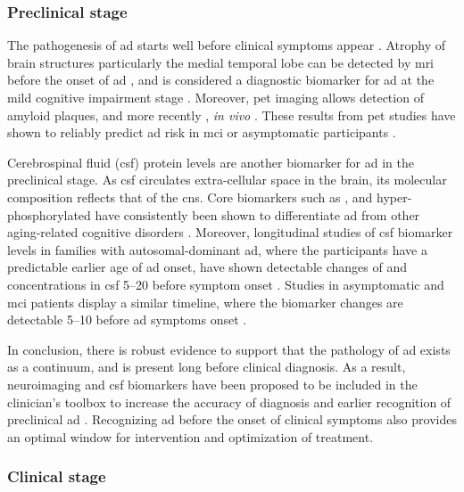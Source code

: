 \subsubsection{Preclinical stage \label{preclinical}}

The pathogenesis of \gls{ad} starts well before clinical symptoms appear \citep{dubois16}. Atrophy of brain structures particularly the medial temporal lobe can be detected by \gls{mri} before the onset of \gls{ad} \citep{jack92, scheltens92, chetelat03}, and is considered a diagnostic biomarker for \gls{ad} at the mild cognitive impairment stage \citep{jack99}. Moreover, \gls{pet} imaging allows detection of amyloid plaques, and more recently \atau{}, \textit{in vivo} \citep{mathis03, maruyama13, okamura13}. These results from \gls{pet} studies have shown to reliably predict \gls{ad} risk in \gls{mci} or asymptomatic participants \citep{klunk04, chien14, sepulcre16}.

Cerebrospinal fluid (\gls{csf}) protein levels are another biomarker for \gls{ad} in the preclinical stage. As \gls{csf} circulates extra-cellular space in the brain, its molecular composition reflects that of the \gls{cns}. Core biomarkers such as \abeta{}, \atau{} and hyper-phosphorylated \atau{} have consistently been shown to differentiate \gls{ad} from other aging-related cognitive disorders \citep{blennow10}. Moreover, longitudinal studies of \gls{csf} biomarker levels in families with autosomal-dominant \gls{ad}, where the participants have a predictable earlier age of \gls{ad} onset, have shown detectable changes of \abeta{} and \atau{} concentrations in \gls{csf} \SIrange{5}{20}{\year} before symptom onset \citep{bateman12, fagan14}. Studies in asymptomatic and \gls{mci} patients display a similar timeline, where the biomarker changes are detectable \SIrange{5}{10}{\year} before \gls{ad} symptoms onset \citep{buchhave12, vos13}. 

In conclusion, there is robust evidence to support that the pathology of \gls{ad} exists as a continuum, and is present long before clinical diagnosis. As a result, neuroimaging and \gls{csf} biomarkers have been proposed to be included in the clinician's toolbox to increase the accuracy of diagnosis and earlier recognition of preclinical \gls{ad} \citep{ad16}. Recognizing \gls{ad} before the onset of clinical symptoms also provides an optimal window for intervention and optimization of treatment. 


\subsubsection{Clinical stage}

